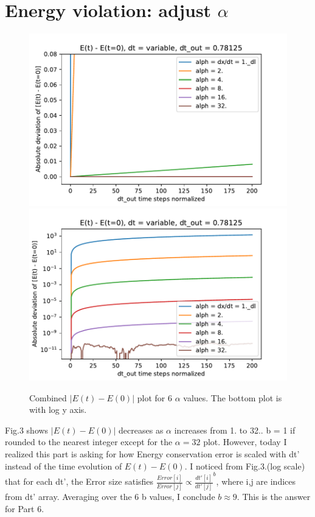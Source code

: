 \documentclass{article}
\begin{document}
\section{Energy violation: adjust $\alpha$}



\begin{figure}[H]
    \centering
    \includegraphics[scale=0.7]{E_dev_alph_all}
    \includegraphics[scale=0.7]{E_dev_alph_all_log}
    \caption{Combined $|E(t) - E(0)|$ plot for 6 $\alpha$ values. The bottom plot is with log y axis.}
    \label{fig:Q5}
\end{figure}

Fig.3 shows $|E(t) - E(0)|$ decreases as $\alpha$ increases from 1. to 32..
b = 1 if rounded to the nearest integer except for the $\alpha=32$ plot. However, today I realized this part is asking for how Energy conservation error is scaled with dt' instead of the time evolution of $E(t) - E(0)$. I noticed from Fig.3.(log scale) that for each dt', the Error size satisfies $\frac{Error[i]}{Error[j]}\propto{\frac{dt'[i]}{dt'[j]}}^{b}$, where i,j are indices from dt' array. Averaging over the 6 b values, I conclude $b\approx9$. This is the answer for Part 6. 
\end{document}
